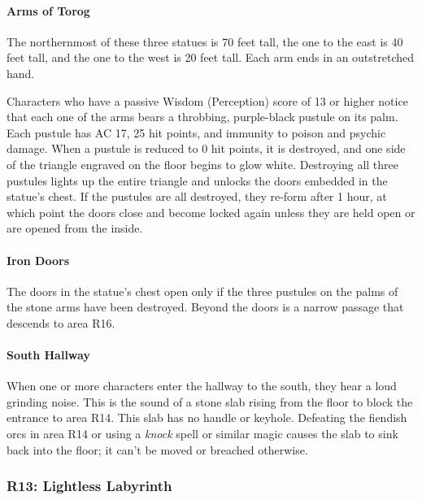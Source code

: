 \documentclass[letterpaper, 11pt, bg=full, twocolumn]{dndbook}
\begin{document}

\paragraph{Arms of Torog}

The northernmost of these three statues is 70 feet tall, the one to the east is 40 feet tall, and the one to the west is 20 feet tall. Each arm ends in an outstretched hand.

Characters who have a passive Wisdom (Perception) score of 13 or higher notice that each one of the arms bears a throbbing, purple-black pustule on its palm. Each pustule has AC 17, 25 hit points, and immunity to poison and psychic damage. When a pustule is reduced to 0 hit points, it is destroyed, and one side of the triangle engraved on the floor begins to glow white. Destroying all three pustules lights up the entire triangle and unlocks the doors embedded in the statue's chest. If the pustules are all destroyed, they re-form after 1 hour, at which point the doors close and become locked again unless they are held open or are opened from the inside.

\paragraph{Iron Doors}

The doors in the statue's chest open only if the three pustules on the palms of the stone arms have been destroyed. Beyond the doors is a narrow passage that descends to area R16.

\paragraph{South Hallway}

When one or more characters enter the hallway to the south, they hear a loud grinding noise. This is the sound of a stone slab rising from the floor to block the entrance to area R14. This slab has no handle or keyhole. Defeating the fiendish orcs in area R14 or using a \textit{knock} spell or similar magic causes the slab to sink back into the floor; it can't be moved or breached otherwise.

\subsubsection{R13: Lightless Labyrinth}
\end{document}
